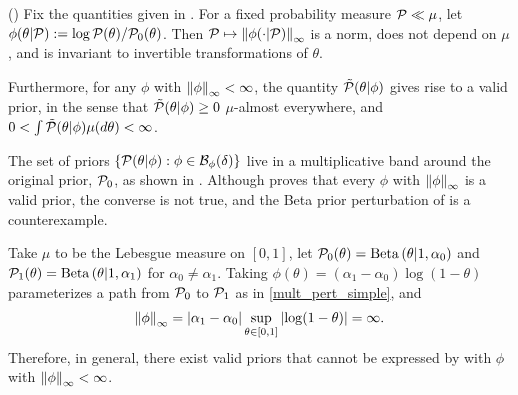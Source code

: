 \begin{lem}
%
(\citet{gustafson:1996:local})
%
Fix the quantities given in .  For a fixed probability
measure $\mathcal{P} \ll \mu$, let $\phi(\theta \vert \mathcal{P}) := \log \mathcal{P}(\theta) /
\mathcal{P}_{0}(\theta)$.  Then $\mathcal{P} \mapsto \left\Vert\phi(\cdot \vert \mathcal{P})\right\Vert_{\infty}$ is a
norm, does not depend on $\mu$, and is invariant to invertible transformations
of $\theta$.

Furthermore, for any $\phi$ with $\left\Vert\phi\right\Vert_{\infty} < \infty$, the quantity
$\tilde{\mathcal{P}}(\theta \vert \phi)$ gives rise to a valid prior, in the sense that
$\tilde{\mathcal{P}}(\theta \vert \phi) \ge 0$ $\mu$-almost everywhere, and
$0 < \int \tilde{\mathcal{P}}(\theta \vert \phi) \mu(d\theta) < \infty$.
%
%
\end{lem}

The set of priors $\left\{\mathcal{P}(\theta \vert \phi) : \phi \in
\mathcal{B}_\phi(\delta)\right\}$ live in a multiplicative band around the original
prior, $\mathcal{P}_{0}$, as shown in . Although
 proves that every $\phi$ with $\left\Vert\phi\right\Vert_{\infty}$ is a
valid prior, the converse is not true, and the Beta prior perturbation of
 is a counterexample.

\FunctionBallFig{}


\begin{ex}
%
Take $\mu$ to be the Lebesgue measure on $[0,1]$, let $\mathcal{P}_{0}(\theta) =
\mathrm{Beta}\left(\theta \vert 1, \alpha_0\right)$ and $\mathcal{P}_{1}(\theta) = \mathrm{Beta}\left(\theta \vert
1, \alpha_1\right)$ for $\alpha_0 \ne \alpha_1$.  Taking
$\phi(\theta) = (\alpha_1 - \alpha_0) \log(1 - \theta)$ parameterizes
a path from $\mathcal{P}_{0}$ to $\mathcal{P}_{1}$ as in \eqref{mult_pert_simple}, and
%
\begin{align*}
%
\norminf{\phi} =
    \abs{\alpha_1 - \alpha_0} \sup_{\theta \in [0,1]} \abs{\log(1 - \theta)} =
    \infty.
%
\end{align*}
%
Therefore, in general, there exist valid priors that cannot be expressed by
 with $\phi$ with $\left\Vert\phi\right\Vert_{\infty} < \infty$.
%
\end{ex}

